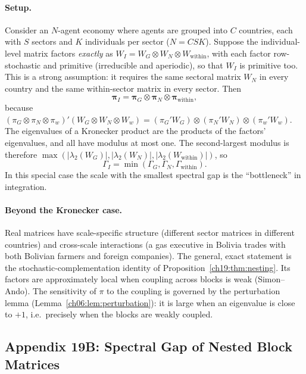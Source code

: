 \documentclass[../structural_economics_book.tex]{subfiles}
\begin{document}
\paragraph{Setup.} Consider an $N$-agent economy where agents are grouped into $C$ countries, each with $S$ sectors and $K$ individuals per sector ($N = CSK$). Suppose the individual-level matrix factors \emph{exactly} as $W_I = W_G \otimes W_{N} \otimes W_{\text{within}}$, with each factor row-stochastic and primitive (irreducible and aperiodic), so that $W_I$ is primitive too. This is a strong assumption: it requires the same sectoral matrix $W_N$ in every country and the same within-sector matrix in every sector. Then
\begin{equation}
\boldsymbol{\pi}_I = \boldsymbol{\pi}_G \otimes \boldsymbol{\pi}_{N} \otimes \boldsymbol{\pi}_{\text{within}},
\end{equation}
because $(\pi_G\otimes\pi_N\otimes\pi_w)'(W_G\otimes W_N\otimes W_w) = (\pi_G'W_G)\otimes(\pi_N'W_N)\otimes(\pi_w'W_w)$. The eigenvalues of a Kronecker product are the products of the factors' eigenvalues, and all have modulus at most one. The second-largest modulus is therefore $\max(|\lambda_2(W_G)|, |\lambda_2(W_N)|, |\lambda_2(W_{\text{within}})|)$, so
\begin{equation}
\Gamma_I = \min(\Gamma_G, \Gamma_N, \Gamma_{\text{within}}).
\end{equation}
In this special case the scale with the smallest spectral gap is the ``bottleneck'' in integration.

\paragraph{Beyond the Kronecker case.} Real matrices have scale-specific structure (different sector matrices in different countries) and cross-scale interactions (a gas executive in Bolivia trades with both Bolivian farmers and foreign companies). The general, exact statement is the stochastic-complementation identity of Proposition~\ref{ch19:thm:nesting}. Its factors are approximately local when coupling across blocks is weak (Simon--Ando). The sensitivity of $\pi$ to the coupling is governed by the perturbation lemma (Lemma~\ref{ch06:lem:perturbation}): it is large when an eigenvalue is close to $+1$, i.e.\ precisely when the blocks are weakly coupled.


\subsection*{Appendix 19B: Spectral Gap of Nested Block Matrices}
\label{ch19:app:nested}
\end{document}
